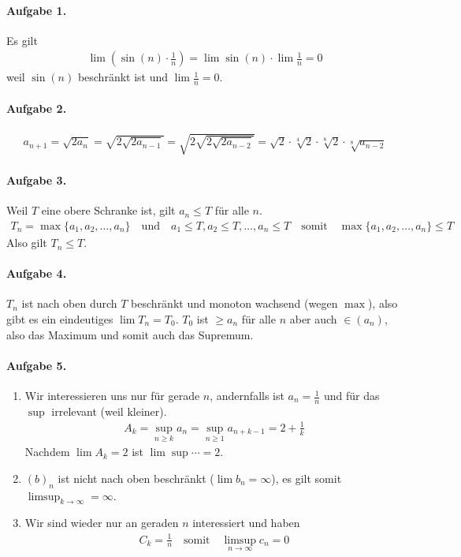 \documentclass{article}
\begin{document}
\paragraph{Aufgabe 1.} Es gilt
\begin{align*}
    \lim \left(\sin(n) \cdot \frac{1}{n}\right) = \lim\sin(n) \cdot \lim\frac{1}{n} = 0
\end{align*}
weil $\sin(n)$ beschränkt ist und $\lim \frac{1}{n} = 0$.

\paragraph*{Aufgabe 2.}
\begin{align*}
    a_{n + 1} = \sqrt{2a_n} = \sqrt{2\sqrt{2a_{n - 1}}} = \sqrt{2\sqrt{2\sqrt{2a_{n - 2}}}} = \sqrt{2} \cdot \sqrt[4]{2} \cdot \sqrt[8]{2} \cdot \sqrt[8]{a_{n - 2}} 
\end{align*}

\paragraph{Aufgabe 3.} Weil $T$ eine obere Schranke ist, gilt $a_n \leq T$ für alle $n$.
\begin{align*}
    T_n = \max\{a_1, a_2, \ldots, a_n\} \quad \text{und} \quad a_1 \leq T, a_2 \leq T, \ldots, a_n \leq T \quad \text{somit} \quad \max\{a_1, a_2, \ldots, a_n\} \leq T
\end{align*}
Also gilt $T_n \leq T$.

\paragraph*{Aufgabe 4.} $T_n$ ist nach oben durch $T$ beschränkt und monoton wachsend (wegen $\max$), also gibt es ein eindeutiges $\lim T_n = T_0$. $T_0$ ist $\geq a_n$ für alle $n$ aber auch $\in (a_n)$, also das Maximum und somit auch das Supremum. 

\paragraph*{Aufgabe 5.}
\begin{enumerate}
    \item Wir interessieren uns nur für gerade $n$, andernfalls ist $a_n = \frac{1}{n}$ und für das $\sup$ irrelevant (weil kleiner).
    \begin{align*}
        A_k = \sup_{n \geq k} a_n = \sup_{n \geq 1}a_{n + k - 1} = 2 + \frac{1}{k}
    \end{align*}
    Nachdem $\lim A_k = 2$ ist $\lim \sup \cdots = 2$.

    \item $(b)_n$ ist nicht nach oben beschränkt ($\lim b_n = \infty$), es gilt somit $\limsup_{k \to \infty} = \infty$.
    
    \item Wir sind wieder nur an geraden $n$ interessiert und haben
    \begin{align*}
        C_k = \frac{1}{n} \quad \text{somit} \quad \limsup_{n \to \infty} c_n = 0
    \end{align*}
\end{enumerate}
\end{document}
